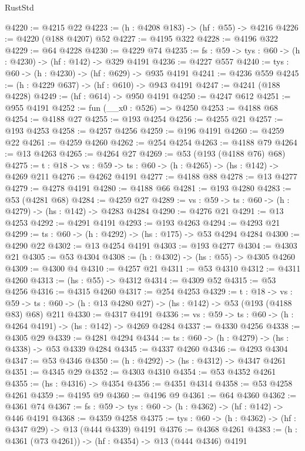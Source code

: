 \begin{lexlean}{RustStd}
\begin{coremodule}
@4220 := @4215 @22
@4223 := (h : @4208 @183) -> (hf : @55) -> @4216
@4226 := @4220 (@188 @4207) @52
@4227 := @4195 @322
@4228 := @4196 @322
@4229 := @64 @4228
@4230 := @4229 @74
@4235 := {fs : @59} -> {tys : @60} -> (h : @4230) -> (hf : @142) -> @329 @4191
@4236 := @4227 @557
@4240 := {tys : @60} -> (h : @4230) -> (hf : @629) -> @935 @4191
@4241 := @4236 @559
@4245 := (h : @4229 @637) -> (hf : @610) -> @943 @4191
@4247 := @4241 (@188 @4228)
@4249 := (hf : @614) -> @950 @4191
@4250 := @4247 @612
@4251 := @955 @4191
@4252 := fun (__x0 : @526) => @4250
@4253 := @4188 @68
@4254 := @4188 @27
@4255 := @193 @4254
@4256 := @4255 @21
@4257 := @193 @4253
@4258 := @4257 @4256
@4259 := @196 @4191
@4260 := @4259 @22
@4261 := @4259 @4260
@4262 := @254 @4254
@4263 := @4188 @79
@4264 := @13 @4263
@4265 := @4264 @27
@4269 := @53 (@193 (@4188 @76) @68)
@4275 := {t : @18} -> {vs : @59} -> {ts : @60} -> (h : @4265) -> (hs : @142) -> @4269 @211
@4276 := @4262 @4191
@4277 := @4188 @88
@4278 := @13 @4277
@4279 := @4278 @4191
@4280 := @4188 @66
@4281 := @193 @4280
@4283 := @53 (@4281 @68)
@4284 := @4259 @27
@4289 := {vs : @59} -> {ts : @60} -> (h : @4279) -> (hs : @142) -> @4283 @4284
@4290 := @4276 @21
@4291 := @13 @4253
@4292 := @4291 @4191
@4293 := @193 @4263
@4294 := @4293 @21
@4299 := {ts : @60} -> (h : @4292) -> (hs : @175) -> @53 @4294 @4284
@4300 := @4290 @22
@4302 := @13 @4254 @4191
@4303 := @193 @4277
@4304 := @4303 @21
@4305 := @53 @4304
@4308 := (h : @4302) -> (hs : @55) -> @4305 @4260
@4309 := @4300 @4
@4310 := @4257 @21
@4311 := @53 @4310
@4312 := @4311 @4260
@4313 := (hs : @55) -> @4312
@4314 := @4309 @52
@4315 := @53 @4256
@4316 := @4315 @4260
@4317 := @254 @4253
@4329 := {t : @18} ->
  {vs : @59} -> {ts : @60} -> (h : @13 @4280 @27) -> (hs : @142) -> @53 (@193 (@4188 @83) @68) @211
@4330 := @4317 @4191
@4336 := {vs : @59} -> {ts : @60} -> (h : @4264 @4191) -> (hs : @142) -> @4269 @4284
@4337 := @4330 @4256
@4338 := @4305 @29
@4339 := @4281 @4294
@4344 := {ts : @60} -> (h : @4279) -> (hs : @4338) -> @53 @4339 @4284
@4345 := @4337 @4260
@4346 := @4293 @4304
@4347 := @53 @4346
@4350 := (h : @4292) -> (hs : @4312) -> @4347 @4261
@4351 := @4345 @29
@4352 := @4303 @4310
@4354 := @53 @4352 @4261
@4355 := (hs : @4316) -> @4354
@4356 := @4351 @4314
@4358 := @53 @4258 @4261
@4359 := @4195 @9
@4360 := @4196 @9
@4361 := @64 @4360
@4362 := @4361 @74
@4367 := {fs : @59} -> {tys : @60} -> (h : @4362) -> (hf : @142) -> @446 @4191
@4368 := @4359 @4258
@4375 := {tys : @60} -> (h : @4362) -> (hf : @4347 @29) -> @13 (@444 @4339) @4191
@4376 := @4368 @4261
@4383 := (h : @4361 (@73 @4261)) -> (hf : @4354) -> @13 (@444 @4346) @4191

\end{coremodule}
\end{lexlean}
